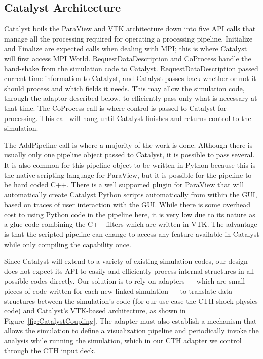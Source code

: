 \subsection{Catalyst Architecture}

Catalyst boils the ParaView and VTK architecture down into five API calls that
manage all the processing required for operating a processing pipeline.
Initialize and Finalize are expected calls when dealing with MPI; this is where
Catalyst will first access MPI World.  RequestDataDescription and CoProcess
handle the hand-shake from the simulation code to Catalyst.
RequestDataDescription passed current time information to Catalyst, and
Catalyst passes back whether or not it should process and which fields it
needs.  This may allow the simulation code, through the adaptor described
below, to efficiently pass only what is necessary at that time.  The CoProcess
call is where control is passed to Catalyst for processing.  This call will
hang until Catalyst finishes and returns control to the simulation.

The AddPipeline call is where a majority of the work is done.  Although there
is usually only one pipeline object passed to Catalyst, it is possible to pass
several.  It is also common for this pipeline object to be written in Python
because this is the native scripting language for ParaView, but it is possible
for the pipeline to be hard coded C++.  There is a well supported plugin for
ParaView that will automatically create Catalyst Python scripts automatically
from within the GUI, based on traces of user interaction with the GUI.  While
there is some overhead cost to using Python code in the pipeline here, it is
very low due to its nature as a glue code combining the C++ filters which are
written in VTK.  The advantage is that the scripted pipeline can change to
access any feature available in Catalyst while only compiling the capability
once.

Since Catalyst will extend to a variety of existing simulation codes, our
design does not expect its API to easily and efficiently process internal
structures in all possible codes directly.  Our solution is to rely on
adapters --- which are small pieces of code written for each new linked
simulation --- to translate data structures between the simulation's code
(for our use case the CTH shock physics code) and Catalyst's VTK-based
architecture, as shown in Figure~\ref{fig:CatalystCoupling}.  The adapter
must also establish a mechanism that allows the simulation to define a
visualization pipeline and periodically invoke the analysis while running
the simulation, which in our CTH adapter we control through the CTH input
deck.

